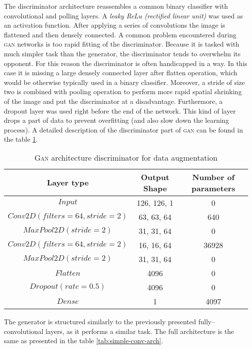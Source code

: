 The discriminator architecture reassembles a common binary classifier with convolutional and polling layers.
A \textit{leaky ReLu (rectified linear unit)} was used as an activation function.
After applying a series of convolutions the image is flattened and then densely connected.
A common problem encountered during \textsc{gan} networks is too rapid fitting of the discriminator.
Because it is tasked with much simpler task than the generator, the discriminator tends to overwhelm its opponent.
For this reason the discriminator is often handicapped in a way.
In this case it is missing a large densely connected layer after flatten operation, which would be otherwise typically used in a binary classifier.
Moreover, a stride of size two is combined with pooling operation to perform more rapid spatial shrinking of the image and put the discriminator at a disadvantage.
Furthermore, a dropout layer was used right before the end of the network.
This kind of layer drops a part of data to prevent overfitting (and also slow down the learning process).
A detailed description of the discriminator part of \textsc{gan} can be found in the table \ref{tab:discriminator-arch}.
\begin{table}
    \centering
    \caption{\textsc{Gan} architecture discriminator for data augmentation}
    \label{tab:discriminator-arch}
    \begin{tabular}{ccc}
        \toprule
        Layer type & Output Shape & Number of parameters \\
        \midrule
        $ Input $      & 126, 126, 1  & 0                    \\
        $ Conv2D(filters=64, stride=2) $ & 63, 63, 64 & 640 \\
        $ MaxPool2D(stride=2) $ & 31, 31, 64 & 0 \\
        $ Conv2D(filters=64, stride=2) $ & 16, 16, 64 & 36928 \\
        $ MaxPool2D(stride=2) $ & 31, 31, 64 & 0 \\
        $ Flatten $ & 4096 & 0 \\
        $ Dropout(rate=0.5) $ & 4096 & 0 \\
        $ Dense $ & 1 & 4097 \\
        \bottomrule
    \end{tabular}
\end{table}
The generator is structured similarly to the previously presented fully--convolutional layers, as it performs a similar task.
The full architecture is the same as presented in the table \ref{tab:simple-conv-arch}.
